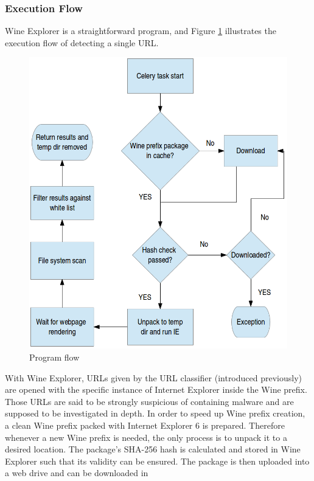 \subsubsection{Execution Flow}
Wine Explorer is a straightforward program, and Figure \ref{fig:wine}
illustrates the execution flow of detecting a single URL. \\
\begin{figure}[htb]
\centering
\includegraphics[scale=0.75]{img/wine-flowchart.png}
\caption{Program flow}
\label{fig:wine}
\end{figure}
With Wine Explorer, URLs given by the URL classifier (introduced 
previously) are opened with the specific instance of Internet Explorer inside the Wine 
prefix. 
Those URLs are said to be strongly suspicious of containing malware and are 
supposed to be investigated in depth. 
In order to speed up Wine prefix creation, a clean Wine prefix packed with 
Internet Explorer 6 is prepared. Therefore whenever a new Wine prefix is needed, 
the only process is to unpack it to a desired location. 
The package's SHA-256 hash is calculated and stored in Wine Explorer such that 
its validity can be ensured. 
The package is then uploaded into a web drive and can be downloaded in 
